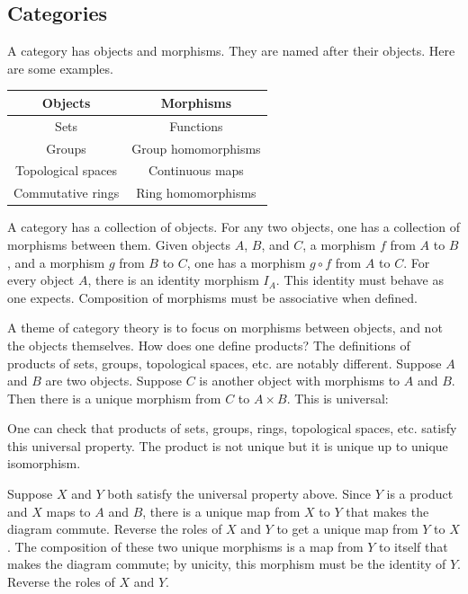 \documentclass[11pt, oneside,margin=1in]{article}
\begin{document}
\subsection{Categories}

A category has objects and morphisms. They are named after their objects. Here are some examples.
	\begin{center}
\begin{tabular}{cc}
    Objects & Morphisms\\
    \midrule
    Sets & Functions\\
    Groups & Group homomorphisms\\
    Topological spaces & Continuous maps\\
    Commutative rings & Ring homomorphisms
\end{tabular}
\end{center}
A category has a collection of objects. For any two objects, one has a collection of morphisms between them. Given objects $A$, $B$, and $C$, a morphism $f$ from $A$ to $B$, and a morphism $g$ from $B$ to $C$, one has a morphism $g\circ f$ from $A$ to $C$. For every object $A$, there is an identity morphism $I_A$. This identity must behave as one expects. Composition of morphisms must be associative when defined.

A theme of category theory is to focus on morphisms between objects, and not the objects themselves. How does one define products? The definitions of products of sets, groups, topological spaces, etc. are notably different. Suppose $A$ and $B$ are two objects. Suppose $C$ is another object with morphisms to $A$ and $B$. Then there is a unique morphism from $C$ to $A\times B$. This is universal:
\begin{center}
\end{center}
One can check that products of sets, groups, rings, topological spaces, etc. satisfy this universal property. The product is not unique but it is unique up to unique isomorphism.

Suppose $X$ and $Y$ both satisfy the universal property above. Since $Y$ is a product and $X$ maps to $A$ and $B$, there is a unique map from $X$ to $Y$ that makes the diagram commute. Reverse the roles of $X$ and $Y$ to get a unique map from $Y$ to $X$. The composition of these two unique morphisms is a map from $Y$ to itself that makes the diagram commute; by unicity, this morphism must be the identity of $Y$. Reverse the roles of $X$ and $Y$.
\end{document}
